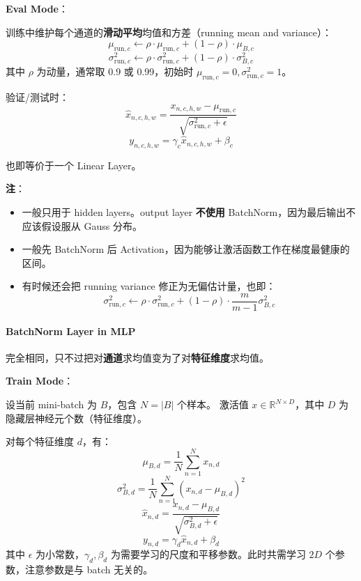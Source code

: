 \textbf{Eval Mode}：

训练中维护每个通道的\textbf{滑动平均}均值和方差（running mean and
variance）： \[
\mu_{\text{run}, c} \leftarrow \rho \cdot \mu_{\text{run}, c} + (1 - \rho) \cdot \mu_{B, c}
\] \[
\sigma^2_{\text{run}, c} \leftarrow \rho \cdot \sigma^2_{\text{run}, c} + (1 - \rho) \cdot \sigma^2_{B, c}
\] 其中 \(\rho\) 为动量，通常取 0.9 或 0.99，初始时
\(\mu_{\text{run}, c} = 0, \sigma^2_{\text{run}, c} = 1\)。

验证/测试时： \[
\hat x_{n,c,h,w} = \frac{x_{n,c,h,w} - \mu_{\text{run}, c}}{\sqrt{\sigma^2_{\text{run}, c} + \epsilon}}
\] \[
y_{n,c,h,w} = \gamma_c \hat x_{n,c,h,w} + \beta_c
\]

也即等价于一个 Linear Layer。

\textbf{注}：

\begin{itemize}
\tightlist
\item
  一般只用于 hidden layers。output layer \textbf{不使用}
  BatchNorm，因为最后输出不应该假设服从 Gauss 分布。
\item
  一般先 BatchNorm 后
  Activation，因为能够让激活函数工作在梯度最健康的区间。
\item
  有时候还会把 running variance 修正为无偏估计量，也即： \[
    \sigma^2_{\text{run}, c} \leftarrow \rho \cdot \sigma^2_{\text{run}, c}
    + (1-\rho) \cdot \frac{m}{m-1} \sigma^2_{B, c}
    \]
\end{itemize}

\paragraph{BatchNorm Layer in MLP}\label{batchnorm-layer-in-mlp}

完全相同，只不过把对\textbf{通道}求均值变为了对\textbf{特征维度}求均值。

\textbf{Train Mode}：

设当前 mini-batch 为 \(B\)，包含 \(N = |B|\) 个样本。 激活值
\(x \in \mathbb{R}^{N \times D}\)，其中 \(D\)
为隐藏层神经元个数（特征维度）。

对每个特征维度 \(d\)，有： \[
\mu_{B, d} = \frac{1}{N}\sum_{n=1}^N x_{n, d}
\] \[
\sigma_{B, d}^2 = \frac{1}{N}\sum_{n=1}^N (x_{n, d} - \mu_{B, d})^2
\] \[
\hat x_{n, d} = \frac{x_{n, d} - \mu_{B, d}}{\sqrt{\sigma_{B, d}^2 + \epsilon}}
\] \[
y_{n, d} = \gamma_d \hat x_{n, d} + \beta_d
\] 其中 \(\epsilon\) 为小常数，\(\gamma_d, \beta_d\)
为需要学习的尺度和平移参数。此时共需学习 \(2D\) 个参数，注意参数是与
batch 无关的。

